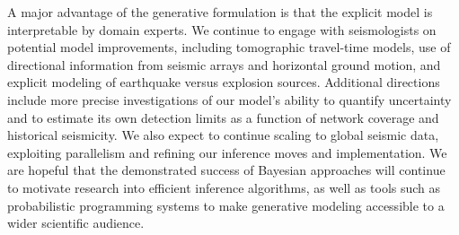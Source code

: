 \documentclass[twoside]{article} \usepackage{aistats2017}
\begin{document}
A major advantage of the generative formulation is that the explicit
model is interpretable by domain experts. We continue to engage with
seismologists on potential model improvements, including tomographic
travel-time models, use of directional information from seismic arrays
and horizontal ground motion, and explicit modeling of earthquake
versus explosion sources. Additional directions include
more precise investigations of our model's ability to quantify
uncertainty and to estimate its own detection limits as a function of
network coverage and historical seismicity. We also expect to continue scaling to global seismic data,
exploiting parallelism and refining our inference moves and implementation. We are hopeful that the demonstrated success of
Bayesian approaches will continue to motivate research into efficient
inference algorithms, as well as tools such as probabilistic
programming systems to make generative modeling accessible to a wider
scientific audience.



\newpage


\end{document}
